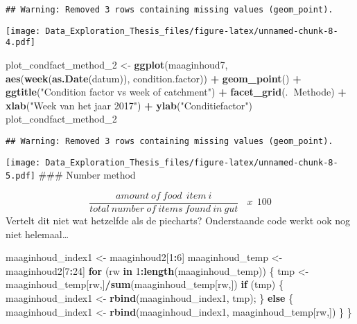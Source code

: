\documentclass[]{article}
\newenvironment{Shaded}{\begin{snugshade}}{\end{snugshade}}
\newcommand{\KeywordTok}[1]{\textcolor[rgb]{0.13,0.29,0.53}{\textbf{#1}}}
\newcommand{\DecValTok}[1]{\textcolor[rgb]{0.00,0.00,0.81}{#1}}
\newcommand{\StringTok}[1]{\textcolor[rgb]{0.31,0.60,0.02}{#1}}
\newcommand{\ControlFlowTok}[1]{\textcolor[rgb]{0.13,0.29,0.53}{\textbf{#1}}}
\newcommand{\OperatorTok}[1]{\textcolor[rgb]{0.81,0.36,0.00}{\textbf{#1}}}
\newcommand{\NormalTok}[1]{#1}
\begin{document}
\begin{verbatim}
## Warning: Removed 3 rows containing missing values (geom_point).
\end{verbatim}

\texttt{[image: Data\_Exploration\_Thesis\_files/figure-latex/unnamed-chunk-8-4.pdf]}

\begin{Shaded}
\begin{Highlighting}[]
\NormalTok{plot_condfact_method_}\DecValTok{2}\NormalTok{ <-}\StringTok{ }\KeywordTok{ggplot}\NormalTok{(maaginhoud7, }\KeywordTok{aes}\NormalTok{(}\KeywordTok{week}\NormalTok{(}\KeywordTok{as.Date}\NormalTok{(datum)), condition.factor)) }\OperatorTok{+}
\StringTok{  }\KeywordTok{geom_point}\NormalTok{() }\OperatorTok{+}
\StringTok{  }\KeywordTok{ggtitle}\NormalTok{(}\StringTok{"Condition factor vs week of catchment"}\NormalTok{) }\OperatorTok{+}
\StringTok{  }\KeywordTok{facet_grid}\NormalTok{(.}\OperatorTok{~}\NormalTok{Methode) }\OperatorTok{+}
\StringTok{  }\KeywordTok{xlab}\NormalTok{(}\StringTok{"Week van het jaar 2017"}\NormalTok{) }\OperatorTok{+}
\StringTok{  }\KeywordTok{ylab}\NormalTok{(}\StringTok{"Conditiefactor"}\NormalTok{)}
\NormalTok{plot_condfact_method_}\DecValTok{2}
\end{Highlighting}
\end{Shaded}

\begin{verbatim}
## Warning: Removed 3 rows containing missing values (geom_point).
\end{verbatim}

\texttt{[image: Data\_Exploration\_Thesis\_files/figure-latex/unnamed-chunk-8-5.pdf]}
\#\#\# Number method

\[ \frac{amount~of~food~~item~i}{total~number~of~items~found~in~gut}~~~~ x ~~ 100  \]
Vertelt dit niet wat hetzelfde als de piecharts? Onderstaande code werkt
ook nog niet helemaal\ldots{}

\begin{Shaded}
\begin{Highlighting}[]
\NormalTok{maaginhoud_index1  <-}\StringTok{ }\NormalTok{maaginhoud2[}\DecValTok{1}\OperatorTok{:}\DecValTok{6}\NormalTok{]}
\NormalTok{maaginhoud_temp <-}\StringTok{ }\NormalTok{maaginhoud2[}\DecValTok{7}\OperatorTok{:}\DecValTok{24}\NormalTok{]}
\ControlFlowTok{for}\NormalTok{ (rw }\ControlFlowTok{in} \DecValTok{1}\OperatorTok{:}\KeywordTok{length}\NormalTok{(maaginhoud_temp)) \{ }
\NormalTok{    tmp <-}\StringTok{ }\NormalTok{maaginhoud_temp[rw,]}\OperatorTok{/}\KeywordTok{sum}\NormalTok{(maaginhoud_temp[rw,]) }
    \ControlFlowTok{if}\NormalTok{ (tmp) \{}
\NormalTok{          maaginhoud_index1 <-}\StringTok{ }\KeywordTok{rbind}\NormalTok{(maaginhoud_index1, tmp); }
\NormalTok{    \} }\ControlFlowTok{else}\NormalTok{ \{}
\NormalTok{      maaginhoud_index1 <-}\StringTok{ }\KeywordTok{rbind}\NormalTok{(maaginhoud_index1, maaginhoud_temp[rw,])}
\NormalTok{    \}}
\NormalTok{\} }
\end{Highlighting}
\end{Shaded}
\end{document}
